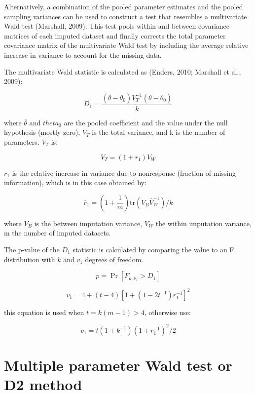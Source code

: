 \documentclass[
]{book}
\begin{document}
Alternatively, a combination of the pooled parameter estimates and the pooled sampling variances can be used to construct a test that resembles a multivariate Wald test (Marshall, 2009). This test pools within and between covariance matrices of each imputed dataset and finally corrects the total parameter covariance matrix of the multivariate Wald test by including the average relative increase in variance to account for the missing data.

The multivariate Wald statistic is calculated as (Enders, 2010; Marshall et al., 2009):

\begin{equation}
  D_1 = \frac{ (\bar\theta - \theta_0)V_T^{-1} (\bar\theta - \theta_0) } {k}
  \label{eq:d1}
\end{equation}

where \(\bar\theta\) and \(theta_0\) are the pooled coefficient and the value under the null hypothesis (mostly zero), \(V_T\) is the total variance, and k is the number of parameters. \(V_T\) is:

\[V_T = (1+r_{1})V_W\]

\(r_1\) is the relative increase in variance due to nonresponse (fraction of missing information), which is in this case obtained by:

\begin{equation}
\bar r_1 = \left(1+\frac{1}{m}\right)\mathrm{tr}(V_B\bar V_W^{-1})/k
\label{eq:r1}
\end{equation}

where \(V_B\) is the between imputation variance, \(V_W\) the within imputation variance, m the number of imputed datasets.

The p-value of the \(D_1\) statistic is calculated by comparing the value to an F distribution with \(k\) and \(v_1\) degrees of freedom.

\[p = \Pr[F_{k,\nu_1}>D_1]\]

\begin{equation}
v_1 = 4 + (t-4)[1+(1-2t^{-1})r_1^{-1}]^2
\label{eq:v1a}
\end{equation}

this equation is used when \(t = k(m-1) > 4\), otherwise use:

\begin{equation}
v_1 = t(1+k^{-1})(1+r_1^{-1})^2/2 
\label{eq:v1b}
\end{equation}

\hypertarget{multiple-parameter-wald-test-or-d2-method}{%
\section{Multiple parameter Wald test or D2 method}\label{multiple-parameter-wald-test-or-d2-method}}
\end{document}
